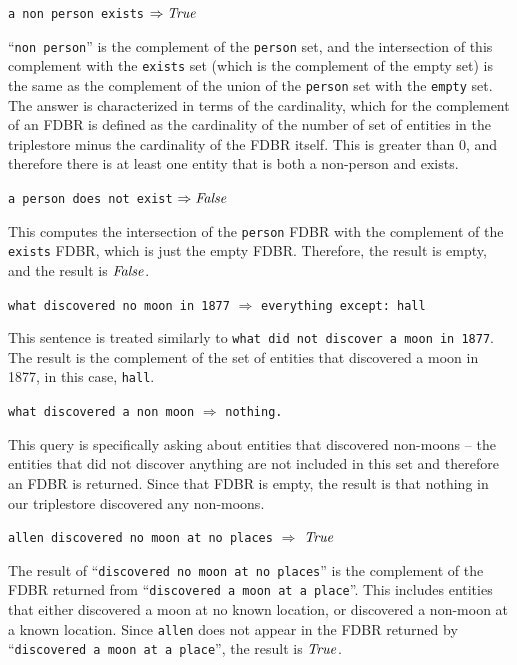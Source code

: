 \documentclass[../main.tex]{subfiles}
\begin{document}
\begin{refsection}
\texttt{a non person exists} $\Rightarrow \operatorname{\mathit{True}}$

\examplespacing

\noindent ``\texttt{non person}'' is the complement of the \texttt{person} set, and the intersection of this complement with the \texttt{exists} set (which is the complement of the empty set) is the same as the complement of the union of the \texttt{person} set with the \texttt{empty} set.  The answer is characterized in terms of the cardinality, which for the complement of an FDBR is defined as the cardinality of the number of set of entities in the triplestore minus the cardinality of the FDBR itself.  This is greater than 0, and therefore there is at least one entity that is both a non-person and exists.

\examplespacing

\texttt{a person does not exist} $\Rightarrow \operatorname{\mathit{False}}$

\examplespacing

\noindent This computes the intersection of the \texttt{person} FDBR with the complement of the \texttt{exists} FDBR, which is just the empty FDBR.  Therefore, the result is empty, and the result is $\operatorname{\mathit{False}}$.

\examplespacing

\texttt{what discovered no moon in 1877} $\Rightarrow$ \texttt{everything except: hall}

\examplespacing

\noindent This sentence is treated similarly to \texttt{what did not discover a moon in 1877}.  The result is the complement of the set of entities that discovered a moon in 1877, in this case, \texttt{hall}.

\examplespacing

\texttt{what discovered a non moon} $\Rightarrow$ \texttt{nothing.}

\examplespacing

\noindent This query is specifically asking about entities that discovered non-moons -- the entities that did not discover anything are not included in this set and therefore an FDBR is returned.  Since that FDBR is empty, the result is that nothing in our triplestore discovered any non-moons.

\examplespacing

\texttt{allen discovered no moon at no places} $\Rightarrow$ $\operatorname{\mathit{True}}$

\examplespacing

\noindent The result of ``\texttt{discovered no moon at no places}'' is the complement of the FDBR returned from ``\texttt{discovered a moon at a place}''.  This includes entities that either discovered a moon at no known location, or discovered a non-moon at a known location.  Since \texttt{allen} does not appear in the FDBR returned by ``\texttt{discovered a moon at a place}'', the result is $\operatorname{\mathit{True}}$.


\end{refsection}
\end{document}
